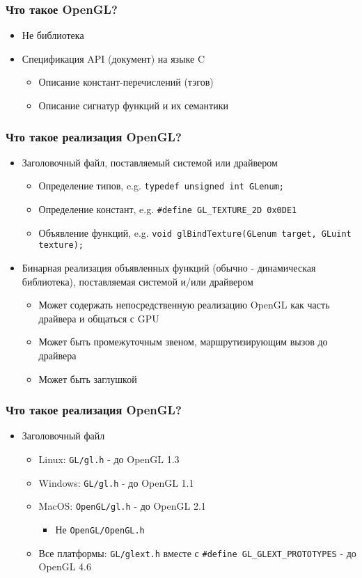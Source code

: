 \documentclass{beamer}
\begin{document}
\begin{frame}
\frametitle{Что такое OpenGL?}
\begin{itemize}
\item {\color{red}Не} библиотека
\item Спецификация API (документ) на языке C
\begin{itemize}
\item Описание констант-перечислений (тэгов)
\item Описание сигнатур функций и их семантики
\end{itemize}
\end{itemize}
\end{frame}

\begin{frame}[fragile]
\frametitle{Что такое реализация OpenGL?}
\pause
\begin{itemize}
\item Заголовочный файл, поставляемый системой или драйвером
\begin{itemize}
\item Определение типов, e.g. \verb|typedef unsigned int GLenum;|
\item Определение констант, e.g. \verb|#define GL_TEXTURE_2D 0x0DE1|
\item Объявление функций, e.g. \verb|void glBindTexture(GLenum target, GLuint texture);|
\end{itemize}
\pause
\item Бинарная реализация объявленных функций (обычно - динамическая библиотека), поставляемая системой и/или драйвером
\begin{itemize}
\item Может содержать непосредственную реализацию OpenGL как часть драйвера и общаться с GPU
\item Может быть промежуточным звеном, маршрутизирующим вызов до драйвера
\item Может быть заглушкой
\end{itemize}
\end{itemize}
\end{frame}

\begin{frame}[fragile]
\frametitle{Что такое реализация OpenGL?}
\begin{itemize}
\item Заголовочный файл
\begin{itemize}
\item Linux: \verb|GL/gl.h| - до OpenGL 1.3
\pause
\item Windows: \verb|GL/gl.h| - до OpenGL 1.1
\pause
\item MacOS: \verb|OpenGL/gl.h| - до OpenGL 2.1
\begin{itemize}
\item {\color{red}Не} \verb|OpenGL/OpenGL.h|
\end{itemize}
\item Все платформы: \verb|GL/glext.h| вместе с \verb|#define GL_GLEXT_PROTOTYPES| - до OpenGL 4.6
\end{itemize}
\end{itemize}
\end{frame}
\end{document}
